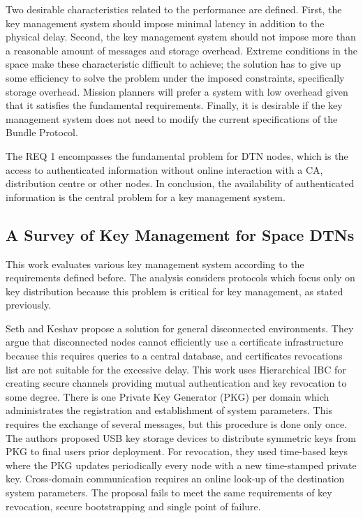 Two desirable characteristics related to the performance are defined. First, the key management system should impose minimal latency in addition to the physical delay. Second, the key management system should not impose more than a reasonable amount of messages and storage overhead. Extreme conditions in the space make these characteristic difficult to achieve; the solution has to give up some efficiency to solve the problem under the imposed constraints, specifically storage overhead. Mission planners will prefer a system with low overhead given that it satisfies the fundamental requirements. Finally, it is desirable if the key management system does not need to modify the current specifications of the Bundle Protocol. 
  

The REQ 1 encompasses the fundamental problem for DTN nodes, which is the access to authenticated information without online interaction with a CA, distribution centre or other nodes. In conclusion, the availability of authenticated information is the central problem for a key management system. 


\subsection{A Survey of Key Management for Space DTNs}

This work evaluates various key management system according to the requirements defined before. The analysis considers protocols which focus only on key distribution because this problem is critical for key management, as stated previously.

Seth and Keshav \cite{seth2005practical} propose a solution for general disconnected environments. They argue that disconnected nodes cannot efficiently use a certificate infrastructure because this requires queries to a central database, and certificates revocations list are not suitable for the excessive delay. This work uses Hierarchical IBC for creating secure channels providing mutual authentication and key revocation to some degree. There is one Private Key Generator (PKG) per domain which administrates the registration and establishment of system parameters. This requires the exchange of several messages, but this procedure is done only once. The authors proposed USB key storage devices to distribute symmetric keys from PKG to final users prior deployment. For revocation, they used time-based keys where the PKG updates periodically every node with a new time-stamped private key. Cross-domain communication requires an online look-up of the destination system parameters. The proposal fails to meet the same requirements of key revocation, secure bootstrapping and single point of failure.

